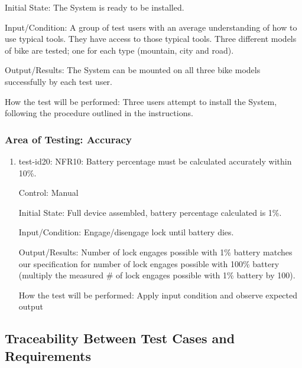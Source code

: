 \documentclass[12pt, titlepage]{article}
\begin{document}
\begin{enumerate}
Initial State: The System is ready to be installed. 

Input/Condition: A group of test users with an average understanding of how to use typical tools. They have access to those typical tools. Three different models of bike are tested; one for each type (mountain, city and road). 

Output/Results: The System can be mounted on all three bike models successfully by each test user. 

How the test will be performed: Three users attempt to install the System, following the procedure outlined in the instructions.  

\end{enumerate}

\subsubsection{Area of Testing: Accuracy}

\begin{enumerate}

\item{test-id20: NFR10: Battery percentage must be calculated accurately within 10\%. \\}

Control: Manual

Initial State: Full device assembled, battery percentage calculated is 1\%. 

Input/Condition: Engage/disengage lock until battery dies.

Output/Results: Number of lock engages possible with 1\% battery matches our specification for number of lock engages possible with 100\% battery (multiply the measured \# of lock engages possible with 1\% battery by 100).

How the test will be performed: Apply input condition and observe expected output

\end{enumerate}

\subsection{Traceability Between Test Cases and Requirements}
\end{document}
